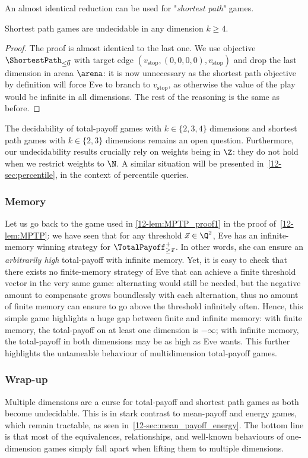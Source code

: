 An almost identical reduction can be used for "\textit{shortest path}" games.

\begin{theorem}
\label{12-thm:SPundec}
Shortest path games are undecidable in any dimension $k \geq 4$.
\end{theorem}

\begin{proof}
The proof is almost identical to the last one. We use objective $\ShortestPath_{\leq \vec{0}}$ with target edge $(v_{\text{stop}}, (0, 0, 0, 0), v_{\text{stop}})$ and drop the last dimension in arena $\arena$: it is now unnecessary as the shortest path objective by definition will force Eve to branch to $v_{\text{stop}}$, as otherwise the value of the play would be infinite in all dimensions. The rest of the reasoning is the same as before.
\end{proof}

\begin{remark}
The decidability of total-payoff games with $k \in \{2, 3, 4\}$ dimensions and shortest path games with $k \in \{2, 3\}$ dimensions remains an open question. Furthermore, our undecidability results crucially rely on weights being in $\Z$: they do not hold when we restrict weights to $\N$. A similar situation will be presented in~\cref{12-sec:percentile}, in the context of percentile queries.
\end{remark}

\subsubsection*{Memory} Let us go back to the game used in \cref{12-lem:MPTP_proof1} in the proof of~\cref{12-lem:MPTP}: we have seen that for any threshold $\vec{x} \in \Q^{2}$, Eve has an infinite-memory winning strategy for $\TotalPayoff^{+}_{\geq \vec{x}}$. In other words, she can ensure an \textit{arbitrarily high} total-payoff with infinite memory. Yet, it is easy to check that there exists no finite-memory strategy of Eve that can achieve a finite threshold vector in the very same game: alternating would still be needed, but the negative amount to compensate grows boundlessly with each alternation, thus no amount of finite memory can ensure to go above the threshold infinitely often. Hence, this simple game highlights a huge gap between finite and infinite memory: with finite memory, the total-payoff on at least one dimension is $-\infty$; with infinite memory, the total-payoff in both dimensions may be as high as Eve wants. This further highlights the untameable behaviour of multidimension total-payoff games.

\subsubsection*{Wrap-up} Multiple dimensions are a curse for total-payoff and shortest path games as both become undecidable. This is in stark contrast to mean-payoff and energy games, which remain tractable, as seen in~\cref{12-sec:mean_payoff_energy}. The bottom line is that most of the equivalences, relationships, and well-known behaviours of one-dimension games simply fall apart when lifting them to multiple dimensions.
